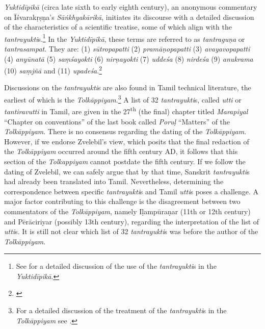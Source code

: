 \emph{Yuktidīpikā} (circa late sixth to early eighth century), an anonymous commentary on Īśvarakṛṣṇa's \emph{Sāṅkhyakārikā}, initiates its discourse with a detailed discussion of the characteristics of a scientific treatise, some of which align with the \emph{tantrayukti}s.\footnote{See \cite[605--614]{ober-1967} for a detailed discussion of the use of the \emph{tantrayukti}s in the \emph{Yuktidīpikā}.} 
In the \emph{Yuktidīpikā}, these terms are referred to as \emph{tantraguṇa} or \emph{tantrasampat}. They are: (1) \emph{sūtropapatti} (2) \emph{pramāṇopapatti} (3) \emph{avayavopapatti} (4) \emph{anyūnatā} (5) \emph{saṃśayokti} (6) \emph{nirṇayokti} (7) \emph{uddeśa} (8) \emph{nirdeśa} (9) \emph{anukrama} (10) \emph{saṃjñā} and (11) \emph{upadeśa}.\footnote{
	\begin{verse}
	\end{verse}
\cite[3]{wezl-1998}} 

Discussions on the \emph{tantrayukti}s are also found in Tamil technical literature, the earliest of which is the \emph{Tolkāppiyam}.\footnote{For a detailed discussion of the treatment of the \emph{tantrayukti}s in the \emph{Tolkāppiyam} see \cite{chev-2009}.} 
A list of 32 \emph{tantrayukti}s, called \emph{utti} or \emph{tantiravutti} in Tamil, are given in the 27\textsuperscript{th} (the final) chapter titled \emph{Marapiyal} “Chapter on conventions” of the last book called \emph{Poruḷ} “Matters” of the \emph{Tolkāppiyam}. There is no consensus regarding the dating of the \emph{Tolkāppiyam}. However, if we endorse Zvelebil's view, which posits that the final redaction of the \emph{Tolkāppiyam} occurred around the fifth century AD, it follows that this section of the \emph{Tolkappiyam} cannot postdate the fifth century. If we follow the dating of Zvelebil, we can safely argue that by that time, Sanskrit \emph{tantrayukti}s had already been translated into Tamil. Nevertheless, determining the correspondence between specific \emph{tantrayukti}s and Tamil \emph{utti}s poses a challenge. A major factor contributing to this challenge is the disagreement between two commentators of the \emph{Tolkāppiyam}, namely Iḷampūraṇar (11th or 12th century) and Pērāciriyar (possibly 13th century), regarding the interpretation of the list of \emph{utti}s. It is still not clear which list of 32 \emph{tantrayukti}s was before the author of the \emph{Tolkāppiyam}. 

